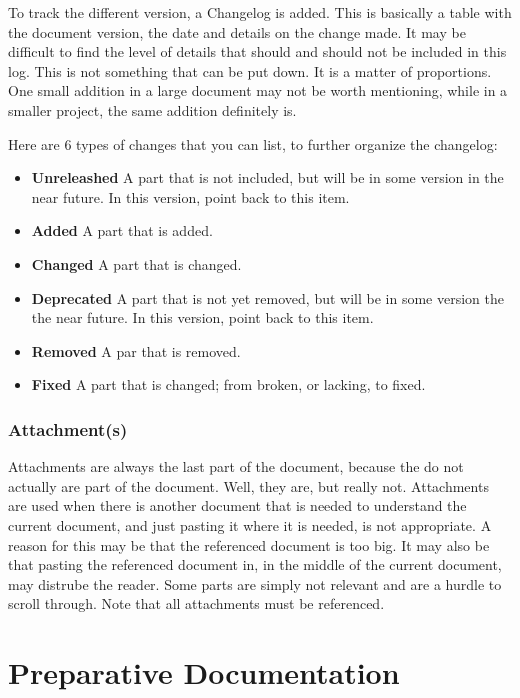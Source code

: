 \documentclass[10pt]{report}
\begin{document}
To track the different version, a Changelog is added. This is basically a table with the document version, the date and details on the change made. It may be difficult to find the level of details that should and should not be included in this log. This is not something that can be put down. It is a matter of proportions. One small addition in a large document may not be worth mentioning, while in a smaller project, the same addition definitely is.

\bigskip

Here are 6 types of changes that you can list, to further organize the changelog:

\begin{itemize}
	\item \textbf{Unreleashed} A part that is not included, but will be in some version in the near future. In this version, point back to this item.
	\item \textbf{Added} A part that is added.
	\item \textbf{Changed} A part that is changed.
	\item \textbf{Deprecated} A part that is not yet removed, but will be in some version the the near future. In this version, point back to this item.
	\item \textbf{Removed} A par that is removed.
	\item \textbf{Fixed} A part that is changed; from broken, or lacking, to fixed.
\end{itemize}

\subsection{Attachment(s)}

Attachments are always the last part of the document, because the do not actually are part of the document. Well, they are, but really not.
Attachments are used when there is another document that is needed to understand the current document, and just pasting it where it is needed, is not appropriate. A reason for this may be that the referenced document is too big. It may also be that pasting the referenced document in, in the middle of the current document, may distrube the reader. Some parts are simply not relevant and are a hurdle to scroll through.
Note that all attachments must be referenced.

\newpage

\chapter{Preparative Documentation}
\thispagestyle{fancy}
\end{document}

